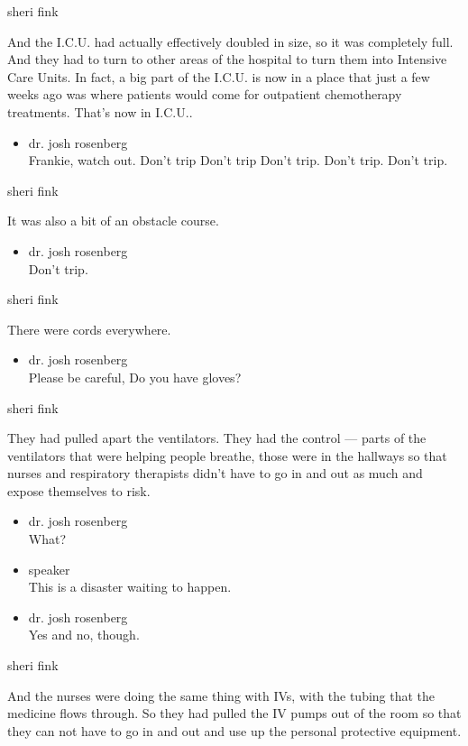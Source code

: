 sheri fink

And the I.C.U. had actually effectively doubled in size, so it was
completely full. And they had to turn to other areas of the hospital to
turn them into Intensive Care Units. In fact, a big part of the I.C.U.
is now in a place that just a few weeks ago was where patients would
come for outpatient chemotherapy treatments. That's now in I.C.U..

\begin{itemize}
\tightlist
\item
  dr. josh rosenberg\\
  Frankie, watch out. Don't trip Don't trip Don't trip. Don't trip.
  Don't trip.
\end{itemize}

sheri fink

It was also a bit of an obstacle course.

\begin{itemize}
\tightlist
\item
  dr. josh rosenberg\\
  Don't trip.
\end{itemize}

sheri fink

There were cords everywhere.

\begin{itemize}
\tightlist
\item
  dr. josh rosenberg\\
  Please be careful, Do you have gloves?
\end{itemize}

sheri fink

They had pulled apart the ventilators. They had the control --- parts of
the ventilators that were helping people breathe, those were in the
hallways so that nurses and respiratory therapists didn't have to go in
and out as much and expose themselves to risk.

\begin{itemize}
\item
  dr. josh rosenberg\\
  What?
\item
  speaker\\
  This is a disaster waiting to happen.
\item
  dr. josh rosenberg\\
  Yes and no, though.
\end{itemize}

sheri fink

And the nurses were doing the same thing with IVs, with the tubing that
the medicine flows through. So they had pulled the IV pumps out of the
room so that they can not have to go in and out and use up the personal
protective equipment.

